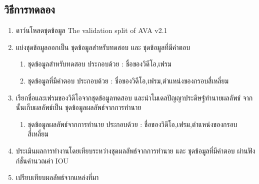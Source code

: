 \subsection*{วิธีการทดลอง}
	\begin{enumerate}
		\item ดาว์นโหลดชุดข้อมูล The validation split of AVA v2.1
		\item แบ่งชุดข้อมูลออกเป็น ชุดข้อมูลสำหรับทดสอบ และ ชุดข้อมูลที่มีคำตอบ
			\begin{enumerate}
				\item ชุดข้อมูลสำหรับทดสอบ ประกอบด้วย : ชื่อของวิดีโอ,เฟรม
				\item ชุดข้อมูลที่มีคำตอบ ประกอบด้วย : ชื่อของวิดีโอ,เฟรม,ตำแหน่งของกรอบสี่เหลี่ยม
			\end{enumerate}
		\item เรียกชื่อและเฟรมของวิดีโอจากชุดข้อมูลทดสอบ และนำโมเดลปัญญาประดิษฐ์ทำนายผลลัพธ์ จากนั้นเก็บผลลัพธ์เป็น ชุดข้อมูลผลลัพธ์จากการทำนาย
			\begin{enumerate}
				\item ชุดข้อมูลผลลัพธ์จากการทำนาย ประกอบด้วย : ชื่อของวิดีโอ,เฟรม,ตำแหน่งของกรอบสี่เหลี่ยม
			\end{enumerate}
		\item ประเมินผลการทำงานโดยเทียบระหว่างชุดผลลัพธ์จากการทำนาย และ ชุดข้อมูลที่มีคำตอบ ผ่านฟังก์ชั่นคำนวณค่า IOU		
		\item เปรียบเทียบผลลัพธ์จากแหล่งที่มา
\end{enumerate}
